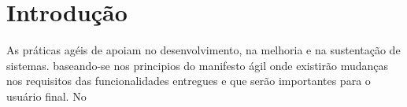 %
%
%
%
%
%
%
%
%
%
%
%
%
%
%
%
%
%
%


\section*{Introdução}

As práticas agéis de apoiam no desenvolvimento, na melhoria e na sustentação de sistemas. baseando-se nos principios do manifesto ágil onde existirão mudanças nos requisitos das funcionalidades entregues e que serão importantes para o usuário final.
No 


